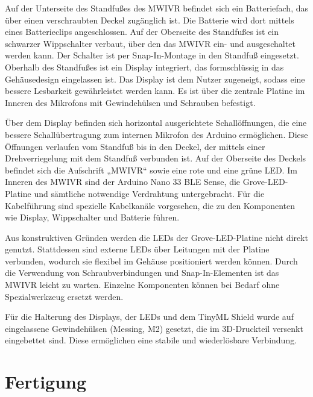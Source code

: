 \bigskip

Auf der Unterseite des Standfußes des MWIVR befindet sich ein Batteriefach, das über einen verschraubten Deckel zugänglich ist. Die Batterie wird dort mittels eines Batterieclips angeschlossen.
Auf der Oberseite des Standfußes ist ein schwarzer Wippschalter verbaut, über den das MWIVR ein- und ausgeschaltet werden kann. Der Schalter ist per Snap-In-Montage in den Standfuß eingesetzt.
Oberhalb des Standfußes ist ein Display integriert, das formschlüssig in das Gehäusedesign eingelassen ist. Das Display ist dem Nutzer zugeneigt, sodass eine bessere Lesbarkeit gewährleistet werden kann. Es ist über die zentrale Platine im Inneren des Mikrofons mit Gewindehülsen und Schrauben befestigt.

\bigskip

Über dem Display befinden sich horizontal ausgerichtete Schallöffnungen, die eine bessere Schallübertragung zum internen Mikrofon des Arduino ermöglichen. Diese Öffnungen verlaufen vom Standfuß bis in den Deckel, der mittels einer Drehverriegelung mit dem Standfuß verbunden ist. Auf der Oberseite des Deckels befindet sich die Aufschrift „MWIVR“ sowie eine rote und eine grüne LED.
Im Inneren des MWIVR sind der Arduino Nano 33 BLE Sense, die Grove-LED-Platine und sämtliche notwendige Verdrahtung untergebracht. Für die Kabelführung sind spezielle Kabelkanäle vorgesehen, die zu den Komponenten wie Display, Wippschalter und Batterie führen.

\bigskip

Aus konstruktiven Gründen werden die LEDs der Grove-LED-Platine nicht direkt genutzt. Stattdessen sind externe LEDs über Leitungen mit der Platine verbunden, wodurch sie flexibel im Gehäuse positioniert werden können.
Durch die Verwendung von Schraubverbindungen und Snap-In-Elementen ist das MWIVR leicht zu warten. Einzelne Komponenten können bei Bedarf ohne Spezialwerkzeug ersetzt werden.

Für die Halterung des Displays, der LEDs und dem TinyML Shield wurde auf eingelassene Gewindehülsen (Messing, M2) gesetzt, die im 3D-Druckteil versenkt eingebettet sind. Diese ermöglichen eine stabile und wiederlösbare Verbindung.


\section{Fertigung}

